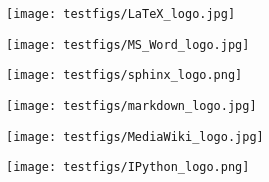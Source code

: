 \documentclass[%
oneside,                 %
final,                   %
10pt]{article}
\begin{document}
\noindent


\vspace{6mm}

\centerline{\texttt{[image: testfigs/LaTeX\_logo.jpg]}}

\vspace{6mm}



\vspace{6mm}

\centerline{\texttt{[image: testfigs/MS\_Word\_logo.jpg]}}

\vspace{6mm}



\vspace{6mm}

\centerline{\texttt{[image: testfigs/sphinx\_logo.png]}}

\vspace{6mm}



\vspace{6mm}

\centerline{\texttt{[image: testfigs/markdown\_logo.jpg]}}

\vspace{6mm}



\vspace{6mm}

\centerline{\texttt{[image: testfigs/MediaWiki\_logo.jpg]}}

\vspace{6mm}



\vspace{6mm}

\centerline{\texttt{[image: testfigs/IPython\_logo.png]}}

\vspace{6mm}
\end{document}
